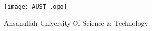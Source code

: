 \begin{titlepage}
	\texttt{[image: AUST\_logo]}
	\vspace{0.75\baselineskip} %
	
	{\LARGE Ahsanullah University Of Science \& Technology} %
	
	\vspace{0.75\baselineskip} %
	
	
	\vspace{2\baselineskip} %

\end{titlepage}



